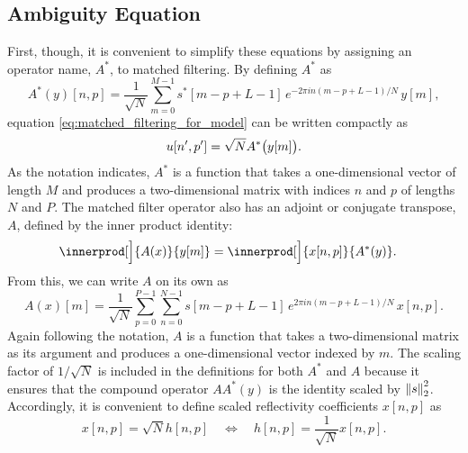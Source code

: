 \subsection{Ambiguity Equation}
First, though, it is convenient to simplify these equations by assigning an operator name, $A^*$, to matched filtering. By defining $A^*$ as
\begin{equation}
 A^*(y)[n,p] = \frac{1}{\sqrt{N}} \sum_{m=0}^{M-1} s^*[m - p + L-1]\, e^{-2\pi i n (m-p+L-1)/N}\, y[m],
\end{equation}
equation \eqref{eq:matched_filtering_for_model} can be written compactly as
\begin{equation}\label{eq:matched_filtering_with_operator}
 u[n',p'] = \sqrt{N} A^*\paren[\big]{y[m]}.
\end{equation}
As the notation indicates, $A^*$ is a function that takes a one-dimensional vector of length $M$ and produces a two-dimensional matrix with indices $n$ and $p$ of lengths $N$ and $P$. The matched filter operator also has an adjoint or conjugate transpose, $A$, defined by the inner product identity:
\begin{align}
 \innerprod[\Big]{A(x)}{y[m]} &= \innerprod[\Big]{x[n,p]}{A^*(y)}.
\end{align}
From this, we can write $A$ on its own as
\begin{equation}
 A(x)[m] = \frac{1}{\sqrt{N}} \sum_{p=0}^{P-1} \sum_{n=0}^{N-1} s[m - p + L-1]\, e^{2\pi i n (m-p+L-1)/N}\, x[n,p].
\end{equation}
Again following the notation, $A$ is a function that takes a two-dimensional matrix as its argument and produces a one-dimensional vector indexed by $m$. The scaling factor of $1/\sqrt{N}$ is included in the definitions for both $A^*$ and $A$ because it ensures that the compound operator $AA^*(y)$ is the identity scaled by $\norm{2}{s}^2$. Accordingly, it is convenient to define scaled reflectivity coefficients $x[n,p]$ as
\begin{equation}
 x[n,p] = \sqrt{N} h[n,p] \quad \Leftrightarrow \quad h[n,p] = \frac{1}{\sqrt{N}} x[n,p].
\end{equation}

